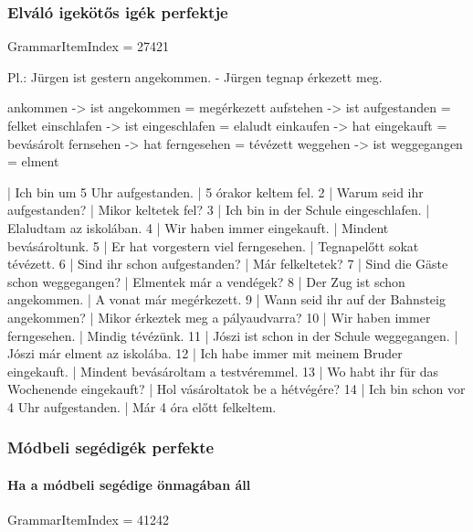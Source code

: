 \documentclass{article}
\newenvironment{desc}{\verbatim}{\endverbatim}
\newenvironment{exmp}{\verbatim}{\endverbatim}
\begin{document}
\begin{exmp}
\end{exmp}

\subsubsection{Elváló igekötős igék perfektje}

GrammarItemIndex = 27421

\begin{desc}
Pl.: Jürgen ist gestern angekommen. - Jürgen tegnap érkezett meg.

ankommen -> ist angekommen = megérkezett
aufstehen -> ist aufgestanden = felket
einschlafen -> ist eingeschlafen = elaludt
einkaufen -> hat eingekauft = bevásárolt
fernsehen -> hat ferngesehen = tévézett
weggehen -> ist weggegangen = elment
\end{desc}

\begin{exmp}
1 | Ich bin um 5 Uhr aufgestanden. | 5 órakor keltem fel.
2 | Warum seid ihr aufgestanden? | Mikor keltetek fel?
3 | Ich bin in der Schule eingeschlafen. | Elaludtam az iskolában.
4 | Wir haben immer eingekauft. | Mindent bevásároltunk.
5 | Er hat vorgestern viel ferngesehen. | Tegnapelőtt sokat tévézett.
6 | Sind ihr schon aufgestanden? | Már felkeltetek?
7 | Sind die Gäste schon weggegangen? | Elmentek már a vendégek?
8 | Der Zug ist schon angekommen. | A vonat már megérkezett.
9 | Wann seid ihr auf der Bahnsteig angekommen? | Mikor érkeztek meg a pályaudvarra?
10 | Wir haben immer ferngesehen. | Mindig tévézünk.
11 | Jószi ist schon in der Schule weggegangen. | Jószi már elment az iskolába.
12 | Ich habe immer mit meinem Bruder eingekauft. | Mindent bevásároltam a testvéremmel.
13 | Wo habt ihr für das Wochenende eingekauft? | Hol vásároltatok be a hétvégére?
14 | Ich bin schon vor 4 Uhr aufgestanden. | Már 4 óra előtt felkeltem.
\end{exmp}

\subsubsection{Módbeli segédigék perfekte}

\paragraph{Ha a módbeli segédige önmagában áll}

GrammarItemIndex = 41242
\end{document}
